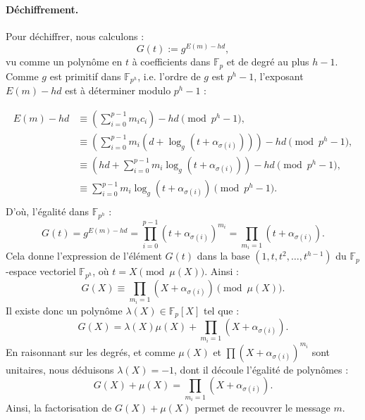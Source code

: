 \documentclass[a4paper, titlepage, 11pt]{article}
\theoremstyle{definition}
\theoremstyle{remark}
\def\gf #1{\mathbb{F}_{#1}}
\begin{document}
\paragraph{Déchiffrement.}Pour déchiffrer, nous calculons :
$$G(t) := g^{E(m) - hd},$$
vu comme un polynôme en $t$ à coefficients dans $\gf{p}$ et de degré au plus $h-1$. Comme $g$ est primitif dans $\gf{p^h}$, i.e. l'ordre de $g$ est $p^h-1$, l'exposant $E(m) - hd$ est à déterminer modulo $p^h-1$ :

\begin{align*}
E(m) - hd &\equiv \left(\sum_{i=0}^{p-1} m_ic_i\right) - hd \pmod{p^h-1}, \\
&\equiv \left(\sum_{i=0}^{p-1} m_i\left(d + \log_g\left(t + \alpha_{\sigma(i)}\right)\right)\right) - hd \pmod{p^h-1}, \\
&\equiv \left(hd + \sum_{i=0}^{p-1} m_i\log_g\left(t + \alpha_{\sigma(i)}\right)\right) - hd \pmod{p^h-1}, \\
&\equiv  \sum_{i=0}^{p-1} m_i\log_g\left(t + \alpha_{\sigma(i)}\right) \pmod{p^h-1}. \\
\end{align*}
D'où, l'égalité dans $\gf{p^h}$ :
$$G(t) = g^{E(m) - hd} = \prod_{i=0}^{p-1} \left(t+\alpha_{\sigma(i)}\right)^{m_i} = \prod_{m_i = 1} \left(t+\alpha_{\sigma(i)}\right).$$
Cela donne l'expression de l'élément $G(t)$ dans la base $(1,t,t^2, \dots, t^{h-1})$ du $\gf{p}$-espace vectoriel $\gf{p^h}$, où $t = X \pmod{\mu(X)}$. Ainsi :
$$G(X) \equiv \prod_{m_i = 1} \left(X+\alpha_{\sigma(i)}\right) \pmod{\mu(X)}.$$
Il existe donc un polynôme $\lambda(X) \in \gf{p}[X]$ tel que : $$G(X) = \lambda(X) \mu(X) + \prod_{m_i = 1} \left(X+\alpha_{\sigma(i)}\right).$$
En raisonnant sur les degrés, et comme $\mu(X)$ et $\prod \left(X+\alpha_{\sigma(i)}\right)^{m_i}$ sont unitaires, nous déduisons  $\lambda(X) = -1$, dont il découle l'égalité de polynômes :
$$G(X) + \mu(X) = \prod_{m_i = 1} \left(X+\alpha_{\sigma(i)}\right).$$
Ainsi, la factorisation de $G(X)+\mu(X)$ permet de recouvrer le message $m$.
\end{document}
